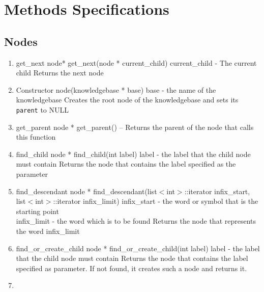 \section{Methods Specifications}
\subsection{Nodes}
\begin{enumerate}
\item \begin{detail}
{get\_next}
{node* get\_next(node * current\_child)}
{current\_child - The current child}
{Returns the next node} 
\end{detail}
\item \begin{detail}
{Constructor}
{node(knowledgebase * base)}
{base - the name of the knowledgebase}
{Creates the root node of the knowledgebase and sets its \texttt{parent} to NULL} 
\end{detail}
\item \begin{detail}
{get\_parent}
{node * get\_parent()}
{--}
{Returns the parent of the node that calls this function} 
\end{detail}
\item \begin{detail}
{find\_child}
{node * find\_child(int label)}
{label - the label that the child node must contain}
{Returns the node that contains the label specified as the parameter} 
\end{detail}
\item \begin{detail}
{find\_descendant}
{node * find\_descendant(list$<$int$>$::iterator infix\_start,\\ list$<$int$>$::iterator infix\_limit)}
{infix\_start - the word or symbol that is the starting point \\ infix\_limit - the word which is to be found}
{Returns the node that represents the word infix\_limit} 
\end{detail}
\item \begin{detail}
{find\_or\_create\_child}
{node * find\_or\_create\_child(int label)}
{label - the label that the child node must contain}
{Returns the node that contains the label specified as parameter. If not found, it creates such a node and returns it.} 
\end{detail}
\item \begin{detail}

\end{detail}
\end{enumerate}
